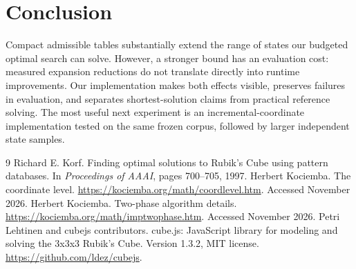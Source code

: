\documentclass{article}
\begin{document}
\section{Conclusion}
Compact admissible tables substantially extend the range of states our budgeted optimal search can solve. However, a stronger bound has an evaluation cost: measured expansion reductions do not translate directly into runtime improvements. Our implementation makes both effects visible, preserves failures in evaluation, and separates shortest-solution claims from practical reference solving. The most useful next experiment is an incremental-coordinate implementation tested on the same frozen corpus, followed by larger independent state samples.

\clearpage
\begin{thebibliography}{9}
Richard E. Korf. Finding optimal solutions to Rubik's Cube using pattern databases. In \emph{Proceedings of AAAI}, pages 700--705, 1997.
Herbert Kociemba. The coordinate level. \url{https://kociemba.org/math/coordlevel.htm}. Accessed November 2026.
Herbert Kociemba. Two-phase algorithm details. \url{https://kociemba.org/math/imptwophase.htm}. Accessed November 2026.
Petri Lehtinen and cubejs contributors. cube.js: JavaScript library for modeling and solving the 3x3x3 Rubik's Cube. Version 1.3.2, MIT license. \url{https://github.com/ldez/cubejs}.
\end{thebibliography}
\end{document}
